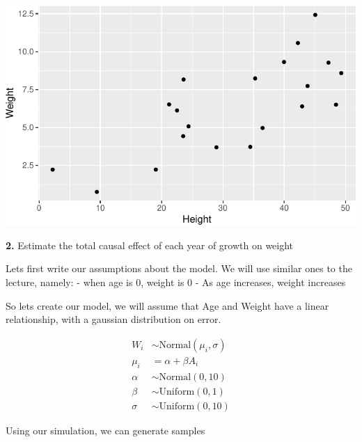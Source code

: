 \documentclass[
  letterpaper,
  DIV=11,
  numbers=noendperiod]{scrartcl}
\begin{document}
\includegraphics{week-2-homework_files/figure-pdf/unnamed-chunk-7-1.pdf}

\textbf{2.} Estimate the total causal effect of each year of growth on
weight

Lets first write our assumptions about the model. We will use similar
ones to the lecture, namely: - when age is 0, weight is 0 - As age
increases, weight increases

So lets create our model, we will assume that Age and Weight have a
linear relationship, with a gaussian distribution on error.

\[
\begin{align}
W_i &\sim \text{Normal}(\mu_i, \sigma) \\
\mu_i &= \alpha + \beta A_i \\
\alpha &\sim \text{Normal}(0, 10) \\
\beta &\sim \text{Uniform}(0, 1) \\
\sigma &\sim \text{Uniform}(0, 10)
\end{align}
\]

Using our simulation, we can generate samples
\end{document}
